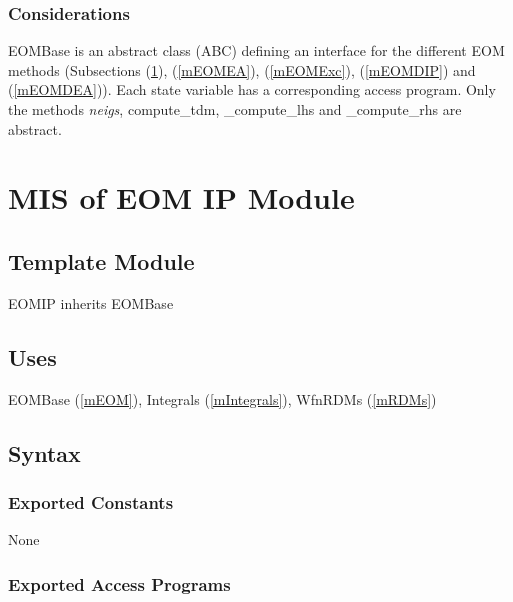 \documentclass[12pt, titlepage]{article}
\begin{document}
\subsubsection{Considerations}
EOMBase is an abstract class (ABC) defining an interface for the 
different EOM methods (Subsections (\ref{mEOMIP}), (\ref{mEOMEA}), 
(\ref{mEOMExc}), (\ref{mEOMDIP}) and (\ref{mEOMDEA})). Each state variable has a 
corresponding access program. Only the methods \textit{neigs}, compute\_tdm, 
\_compute\_lhs and \_compute\_rhs are abstract.

\newpage

\section{MIS of EOM IP Module} \label{mEOMIP}

\subsection{Template Module}

EOMIP inherits EOMBase

\subsection{Uses}
EOMBase (\ref{mEOM}), Integrals (\ref{mIntegrals}), WfnRDMs (\ref{mRDMs})

\subsection{Syntax}

\subsubsection{Exported Constants}
None

\subsubsection{Exported Access Programs}
\end{document}

